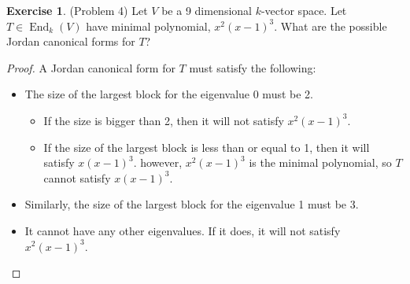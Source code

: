 \documentclass[12pt, psamsfonts]{amsart}
\theoremstyle{definition}
\newtheorem*{exer}{Exercise}
\theoremstyle{remark}
\DeclareMathOperator{\End}{End}
\numberwithin{equation}{section}
\begin{document}
\begin{exer}{(Problem 4)}
  Let $V$ be a 9 dimensional $k$-vector space.
  Let $T \in \End_k(V)$ have minimal polynomial, $x^2(x - 1)^3$.
  What are the possible Jordan canonical forms for $T$?
\end{exer}

\begin{proof}
  A Jordan canonical form for $T$ must satisfy the following:
  \begin{itemize}
    \item
      The size of the largest block for the eigenvalue 0 must be 2.
      \begin{itemize}
        \item
          If the size is bigger than 2, then it will not satisfy $x^2(x - 1)^3$.
        \item
          If the size of the largest block is less than or equal to 1, then it will satisfy $x(x - 1)^3$.
          however, $x^2(x - 1)^3$ is the minimal polynomial, so $T$ cannot satisfy $x(x - 1)^3$.
      \end{itemize}
    \item
      Similarly, the size of the largest block for the eigenvalue 1 must be 3.
    \item
      It cannot have any other eigenvalues.
      If it does, it will not satisfy $x^2(x - 1)^3$.
  \end{itemize}


\end{proof}
\end{document}
